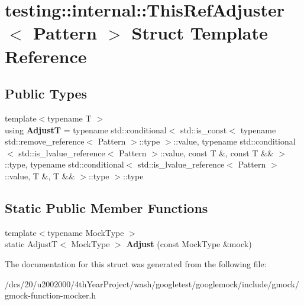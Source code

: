 \hypertarget{structtesting_1_1internal_1_1ThisRefAdjuster}{}\section{testing\+:\+:internal\+:\+:This\+Ref\+Adjuster$<$ Pattern $>$ Struct Template Reference}
\label{structtesting_1_1internal_1_1ThisRefAdjuster}
\subsection*{Public Types}
\begin{DoxyCompactItemize}
\item 
\mbox{\label{structtesting_1_1internal_1_1ThisRefAdjuster_a7c7ab5d3ec35491fcedf4b9e71a6eb54}} 
{\footnotesize template$<$typename T $>$ }\\using {\bfseries AdjustT} = typename std\+::conditional$<$ std\+::is\+\_\+const$<$ typename std\+::remove\+\_\+reference$<$ Pattern $>$\+::type $>$\+::value, typename std\+::conditional$<$ std\+::is\+\_\+lvalue\+\_\+reference$<$ Pattern $>$\+::value, const T \&, const T \&\& $>$\+::type, typename std\+::conditional$<$ std\+::is\+\_\+lvalue\+\_\+reference$<$ Pattern $>$\+::value, T \&, T \&\& $>$\+::type $>$\+::type
\end{DoxyCompactItemize}
\subsection*{Static Public Member Functions}
\begin{DoxyCompactItemize}
\item 
\mbox{\label{structtesting_1_1internal_1_1ThisRefAdjuster_ae44907f7961574589a1ec6b87597430a}} 
{\footnotesize template$<$typename Mock\+Type $>$ }\\static AdjustT$<$ Mock\+Type $>$ {\bfseries Adjust} (const Mock\+Type \&mock)
\end{DoxyCompactItemize}


The documentation for this struct was generated from the following file\+:\begin{DoxyCompactItemize}
\item 
/dcs/20/u2002000/4th\+Year\+Project/wash/googletest/googlemock/include/gmock/gmock-\/function-\/mocker.\+h\end{DoxyCompactItemize}
